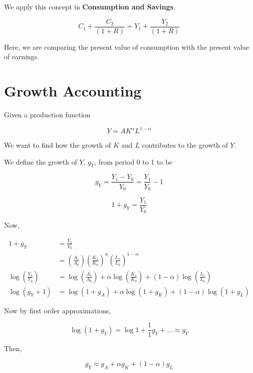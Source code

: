 \documentclass[11pt]{scrartcl}
\begin{document}
We apply this concept in \textbf{Consumption and Savings}.

\[C_1 + \frac{C_2}{(1+R)} = Y_1 + \frac{Y_2}{(1+R)} \]

Here, we are comparing the present value of consumption with the present value of earnings.

\section{Growth Accounting}

Given a production function

\[Y = AK^\alpha L^{1-\alpha}\]

We want to find how the growth of $K$ and $L$ contributes to the growth of $Y$.

We define the growth of $Y$, $g_Y$, from period 0 to 1 to be

\[g_Y = \frac{Y_1-Y_0}{Y_0} = \frac{Y_1}{Y_0} - 1\]

\[1 + g_Y = \frac{Y_1}{Y_0} \]

Now,

\begin{align*}
1 + g_Y &= \frac{Y_1}{Y_0} \\
&= \left(\frac{A_1}{A_0}\right) \left(\frac{K_1}{K_0}\right)^\alpha \left(\frac{L_1}{L_0}\right)^{1-\alpha} \\
\log{\left(\frac{Y_1}{Y_0}\right)} &= \log{\left(\frac{A_1}{A_0}\right)} + \alpha \log{\left(\frac{K_1}{K_0}\right)} + (1-\alpha) \log{\left(\frac{L_1}{L_0}\right)} \\ 
\log{(g_Y +1)} &= \log{(1 + g_A)} + \alpha \log{(1+g_K)} + (1-\alpha)\log{(1+g_L)}
\end{align*}

Now by first order approximations,

\[ \log{(1+g_Y)} = \log{1} + \frac{1}{1} g_Y + ... \approx g_Y \]

Then,

\[g_Y \approx g_A + \alpha g_K + (1-\alpha) g_L \]
\end{document}

